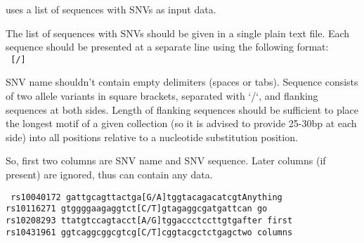  uses a list of sequences with SNVs as input data.

The list of sequences with SNVs should be given in a single plain text file. 
Each sequence should be presented at a separate line using the following format:\\
\texttt{ [/]}

SNV name shouldn't contain empty delimiters (spaces or tabs). 
Sequence consists of two allele variants in square brackets, separated with `/`, and flanking sequences at both sides. Length of flanking sequences should be sufficient to place the longest motif of a given collection (so it is advised to provide 25-30bp at each side) into all positions relative to a nucleotide substitution position. 

So, first two columns are SNV name and SNV sequence. Later columns (if present) are ignored, thus can contain any data.

\noindent\texttt{%
rs10040172 gattgcagttactga[G/A]tggtacagacatcgt\quad Anything\\
rs10116271 gtggggaagaggtct[C/T]gtagaggcgatgatt\quad can go\\
rs10208293 ttatgtccagtacct[A/G]tggaccctccttgtg\quad after first\\
rs10431961 ggtcaggcggcgtcg[C/T]cggtacgctctgagc\quad two columns
}
